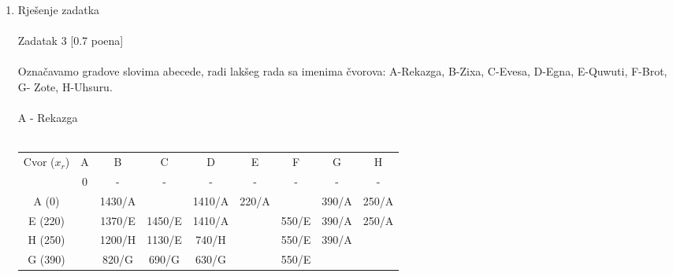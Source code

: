 \documentclass[12pt]{article}
\begin{document}
\begin{enumerate}
{\begin{tabular}{|c|c|c|c|c|c|c|c|c|c|c|c|c|}
\end{tabular}
}
\\
\\
\\
\item Rješenje zadatka \\
\\
Zadatak 3 [0.7 poena] \\
\\
Označavamo gradove slovima abecede, radi lakšeg rada sa imenima
čvorova: A-Rekazga, B-Zixa, C-Evesa, D-Egna, E-Quwuti, F-Brot, G-
Zote, H-Uhsuru.
\\
\\
A - Rekazga
\\
\\
\begin{tabular}{|c|c|c|c|c|c|c|c|c|}
\hline
Cvor ($x_r$) & A                        & B                            & C                            & D                            & E                            & F                            & G                            & H                            \\ \cline{2-9} 
             & {\color[HTML]{FE0000} 0} & -                            & -                            & -                            & -                            & -                            & -                            & -                            \\ \hline
A (0)        &                          & 1430/A                       &                              & 1410/A                       & {\color[HTML]{FE0000} 220/A} &                              & 390/A                        & 250/A                        \\ \hline
E (220)      &                          & 1370/E                       & 1450/E                       & 1410/A                       &                              & 550/E                        & 390/A                        & {\color[HTML]{FE0000} 250/A} \\ \hline
H (250)      &                          & 1200/H                       & 1130/E                       & 740/H                        &                              & 550/E                        & {\color[HTML]{FE0000} 390/A} &                              \\ \hline
G (390)      &                          & 820/G                        & {\color[HTML]{000000} 690/G} & {\color[HTML]{000000} 630/G} &                              & {\color[HTML]{FE0000} 550/E} &                              &                              \\ \hline

\end{tabular}
\end{enumerate}
\end{document}
